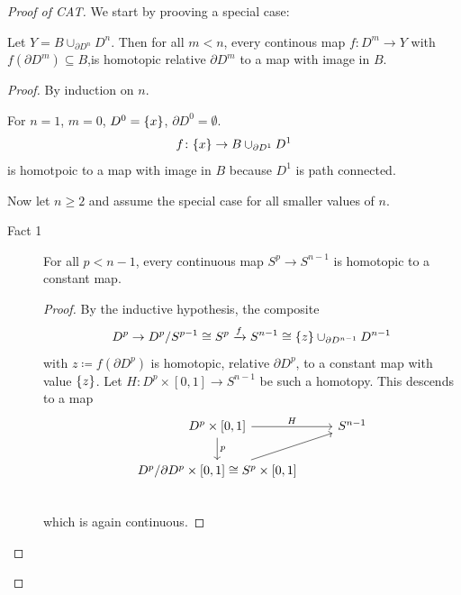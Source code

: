 \documentclass{TemplateLecture}
\begin{document}
\begin{proof}[Proof of CAT]
    We start by prooving a special case:
    \begin{thm}{}{}
        Let \(Y = B\cup _{\partial D^n} D^n\). Then for all \(m < n\), every continous map \(f \colon D^m \to Y\) with \(f(\partial D^m) \subseteq B\),is homotopic relative \(\partial D^m\) to a map with image in \(B\).
    \end{thm}
    \begin{proof}
        By induction on \(n\).

        For \(n = 1\), \(m = 0\), \(D^0 = \{x\}\), \(\partial D^0 = \emptyset\).
        \[f\colon \{x\} \to B\cup_{\partial D^1} D^1\]
        is homotpoic to a map with image in \(B\) because \(D^1\) is path connected.
        
        Now let \(n \geq 2\) and assume the special case for all smaller values of \(n\).
        \begin{description}
            \item[Fact 1] For all \(p < n-1\), every continuous map \(S^p \to S^{n-1}\) is homotopic to a constant map.
            \begin{proof}
                By the inductive hypothesis, the composite
                \[D^p \to D^p/S^{p-1} \cong S^{p} \xrightarrow{f} S^{n-1} \cong \{z\} \cup_{\partial D^{n-1}} D^{n-1}\]
                with \(z\coloneq f(\partial D^p)\) is homotopic, relative \(\partial D^p\), to a constant map with value \(\{z\}\).
                Let \(H\colon D^p \times [0,1] \to S^{n-1}\) be such a homotopy. This descends to a  map
                \[\begin{tikzcd}
                    D^p \times [0,1] \ar[r, "H"] \ar[d, "p"] & S^{n-1} \\
                    D^p/\partial D^p \times [0,1] \cong S^p \times [0,1] \ar[ru] & \\
                \end{tikzcd}\]
                which is again continuous.
            \end{proof}


\end{description}
\end{proof}
\end{proof}
\end{document}
